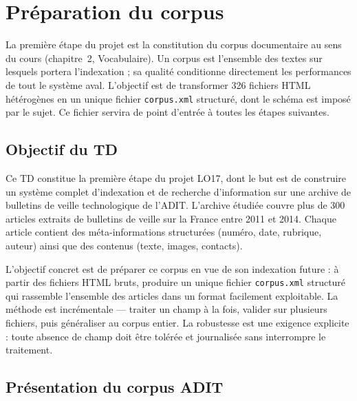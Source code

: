 \chapter{Préparation du corpus}
\label{chap:td1}

La première étape du projet est la constitution du corpus documentaire au sens du
cours (chapitre~2, Vocabulaire). Un corpus est l'ensemble des textes sur lesquels portera
l'indexation ; sa qualité conditionne directement les performances de tout le système aval.
L'objectif est de transformer 326 fichiers HTML hétérogènes en un unique fichier
\texttt{corpus.xml} structuré, dont le schéma est imposé par le sujet. Ce fichier
servira de point d'entrée à toutes les étapes suivantes.

\section{Objectif du TD}

Ce TD constitue la première étape du projet LO17, dont le but est de construire un
système complet d'indexation et de recherche d'information sur une archive de bulletins
de veille technologique de l'ADIT. L'archive étudiée couvre plus de 300 articles extraits
de bulletins de veille sur la France entre 2011 et 2014. Chaque article contient des
méta-informations structurées (numéro, date, rubrique, auteur) ainsi que des contenus
(texte, images, contacts).

L'objectif concret est de préparer ce corpus en vue de son indexation future : à partir
des fichiers HTML bruts, produire un unique fichier \texttt{corpus.xml} structuré qui
rassemble l'ensemble des articles dans un format facilement exploitable. La méthode est
incrémentale — traiter un champ à la fois, valider sur plusieurs fichiers, puis généraliser
au corpus entier. La robustesse est une exigence explicite : toute absence de champ doit
être tolérée et journalisée sans interrompre le traitement.

\section{Présentation du corpus ADIT}

